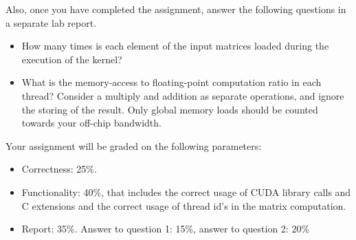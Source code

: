 \documentclass[11.5pt]{article}
\begin{document}
\noindent Also, once you have completed the assignment, answer the following questions in a separate lab report.
\begin{itemize}
\item How many times is each element of the input matrices loaded during the execution of the kernel?
\item What is the memory-access to floating-point computation ratio in each thread? Consider a multiply and addition as separate operations, and ignore the storing of the result. Only global memory loads should be counted towards your off-chip bandwidth.
\end{itemize}
\vspace{24pt}

\noindent Your assignment will be graded on the following parameters:
\begin{itemize}
\item Correctness: 25\%.
\item Functionality: 40\%, that includes the correct usage of CUDA library calls and C extensions and the correct usage of thread id's in the matrix computation.
\item Report: 35\%. Answer to question 1: 15\%, answer to question 2: 20\%
\end{itemize}
\end{document}

